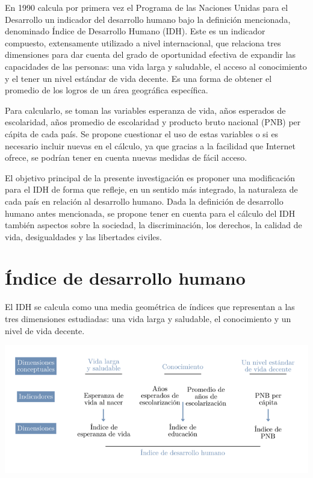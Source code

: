\documentclass[
  10pt,
]{article}
\begin{document}
En 1990 calcula por primera vez el Programa de las Naciones Unidas para
el Desarrollo un indicador del desarrollo humano bajo la definición
mencionada, denominado Índice de Desarrollo Humano (IDH). Este es un
indicador compuesto, extensamente utilizado a nivel internacional, que
relaciona tres dimensiones para dar cuenta del grado de oportunidad
efectiva de expandir las capacidades de las personas: una vida larga y
saludable, el acceso al conocimiento y el tener un nivel estándar de
vida decente. Es una forma de obtener el promedio de los logros de un
área geográfica específica.

Para calcularlo, se toman las variables esperanza de vida, años
esperados de escolaridad, años promedio de escolaridad y producto bruto
nacional (PNB) per cápita de cada país. Se propone cuestionar el uso de
estas variables o si es necesario incluir nuevas en el cálculo, ya que
gracias a la facilidad que Internet ofrece, se podrían tener en cuenta
nuevas medidas de fácil acceso.

El objetivo principal de la presente investigación es proponer una
modificación para el IDH de forma que refleje, en un sentido más
integrado, la naturaleza de cada país en relación al desarrollo humano.
Dada la definición de desarrollo humano antes mencionada, se propone
tener en cuenta para el cálculo del IDH también aspectos sobre la
sociedad, la discriminación, los derechos, la calidad de vida,
desigualdades y las libertades civiles.

\pagebreak

\section{Índice de desarrollo
humano}\label{uxedndice-de-desarrollo-humano}

El IDH se calcula como una media geométrica de índices que representan a
las tres dimensiones estudiadas: una vida larga y saludable, el
conocimiento y un nivel de vida decente.

\includegraphics{diagrama1.png}
\end{document}
